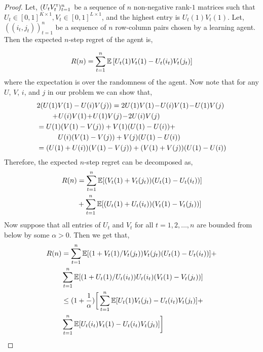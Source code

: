\begin{proof}
Let, $(U_t V_t^\mathsf{\scriptscriptstyle T})_{t = 1}^n$ be a sequence of $n$ non-negative rank-$1$  matrices such that $U_t \in [0, 1]^{K \times 1}, V_t \in [0, 1]^{L \times 1}$, and the highest entry is $U_t(1) V_t(1)$. Let, $((i_t, j_t))_{t = 1}^n$
be a sequence of $n$ row-column pairs chosen by a learning agent. Then the expected $n$-step regret of the agent is,


\begin{align*}
R(n) = \sum_{t = 1}^n \mathbb{E} \left[{U_t(1) V_t(1) - U_t(i_t) V_t(j_t)}\right]
\end{align*}
where the expectation is over the randomness of the agent. Now note that for any $U$, $V$, $i$, and $j$ in our problem we can show that,
\begin{align*}
& 2 (U(1) V(1) - U(i) V(j)) =  2 U(1) V(1) \! - \! U(i) V(1) \! - \! U(1) V(j)\\
&  \hspace*{2em} + \! U(i) V(1) \! + \! U(1) V(j) \! - \! 2 U(i) V(j) \\
& = U(1) (V(1) - V(j))  + V(1) (U(1) -  U(i))  +\\
& \hspace*{3em}  U(i) (V(1)  - V(j))  + V(j) (U(1)  - U(i)) \\
& = (U(1) + U(i)) (V(1) - V(j)) + (V(1) + V(j)) (U(1) - U(i))
\end{align*}
Therefore, the expected $n$-step regret can be decomposed as,
\begin{align*}
R(n) &= \sum_{t = 1}^n \mathbb{E}[{(V_t(1) + V_t(j_t)) (U_t(1) - U_t(i_t))}] \\
&+ \sum_{t = 1}^n \mathbb{E}[{(U_t(1) + U_t(i_t)) (V_t(1) - V_t(j_t))}]
\end{align*}
Now suppose that all entries of $U_t$ and $V_t$ for all $t=1,2,\ldots, n$ are bounded from below by some $\alpha > 0$. Then we get that,
\begin{align*}
R(n)
& = \sum_{t = 1}^n \mathbb{E}[{(1 + V_t(1) / V_t(j_t)) V_t(j_t) (U_t(1) - U_t(i_t))}] +\\
&\sum_{t = 1}^n \mathbb{E}[{(1 + U_t(1) / U_t(i_t)) U_t(i_t) (V_t(1) - V_t(j_t))}] \\
& \leq (1 + \frac{1}{\alpha}) \bigg[\sum_{t = 1}^n \mathbb{E}[{U_t(1) V_t(j_t) - U_t(i_t) V_t(j_t)}] + \\
& \sum_{t = 1}^n \mathbb{E}[{U_t(i_t) V_t(1) - U_t(i_t) V_t(j_t)}]\bigg]
\end{align*}


\end{proof}
